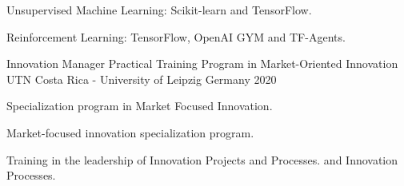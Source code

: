 \begin{cventries}
{\begin{cvitems}
        \item Unsupervised Machine Learning: Scikit-learn and TensorFlow.
        \item Reinforcement Learning: TensorFlow, OpenAI GYM and TF-Agents.
      \end{cvitems}
    }
  \cventry
  {Innovation Manager} %
    {Practical Training Program in Market-Oriented Innovation} %
    {UTN Costa Rica - University of Leipzig Germany} %
    {2020} %
    {
      \begin{cvitems} %
        \item Specialization program in Market Focused Innovation.
        \item Market-focused innovation specialization program.
        \item Training in the leadership of Innovation Projects and Processes.
        and Innovation Processes.
      \end{cvitems}
    }

\end{cventries}
